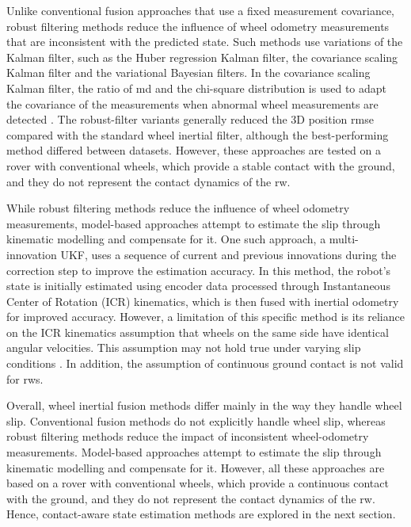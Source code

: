 \documentclass[report.tex]{subfiles}
\begin{document}
    Unlike conventional fusion approaches that use a fixed measurement covariance, robust filtering methods reduce the influence of wheel odometry measurements that are inconsistent with the predicted state. Such methods use variations of the Kalman filter, such as the Huber regression Kalman filter, the covariance scaling Kalman filter and the variational Bayesian filters. In the covariance scaling Kalman filter, the ratio of \gls{md} and the chi-square distribution is used to adapt the covariance of the measurements when abnormal wheel measurements are detected \cite{Das2021}. The robust-filter variants generally reduced the 3D position \gls{rmse} compared with the standard wheel inertial filter, although the best-performing method differed between datasets. However, these approaches are tested on a rover with conventional wheels, which provide a stable contact with the ground, and they do not represent the contact dynamics of the \gls{rw}. 
    
    While robust filtering methods reduce the influence of wheel odometry measurements, model-based approaches attempt to estimate the slip through kinematic modelling and compensate for it. One such approach, a multi-innovation UKF, uses a sequence of current and previous innovations during the correction step to improve the estimation accuracy. In this method, the robot's state is initially estimated using encoder data processed through Instantaneous Center of Rotation (ICR) kinematics, which is then fused with inertial odometry for improved accuracy. However, a limitation of this specific method is its reliance on the ICR kinematics assumption that wheels on the same side have identical angular velocities. This assumption may not hold true under varying slip conditions \cite{Liu2020}. In addition, the assumption of continuous ground contact is not valid for \glspl{rw}. 
    
    Overall, wheel inertial fusion methods differ mainly in the way they handle wheel slip. Conventional fusion methods do not explicitly handle wheel slip, whereas robust filtering methods reduce the impact of inconsistent wheel-odometry measurements. Model-based approaches attempt to estimate the slip through kinematic modelling and compensate for it. However, all these approaches are based on a rover with conventional wheels, which provide a continuous contact with the ground, and they do not represent the contact dynamics of the \gls{rw}. Hence, contact-aware state estimation methods are explored in the next section.
    
\end{document}

